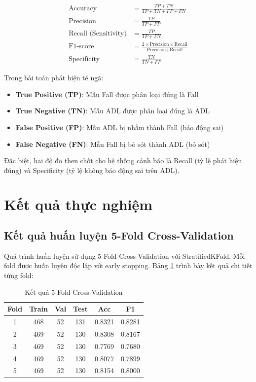 \begin{align}
\text{Accuracy} &= \frac{TP + TN}{TP + TN + FP + FN} \\
\text{Precision} &= \frac{TP}{TP + FP} \\
\text{Recall (Sensitivity)} &= \frac{TP}{TP + FN} \\
\text{F1-score} &= \frac{2 \times \text{Precision} \times \text{Recall}}{\text{Precision} + \text{Recall}} \\
\text{Specificity} &= \frac{TN}{TN + FP}
\end{align}

Trong bài toán phát hiện té ngã:
\begin{itemize}
    \item \textbf{True Positive (TP)}: Mẫu Fall được phân loại đúng là Fall
    \item \textbf{True Negative (TN)}: Mẫu ADL được phân loại đúng là ADL
    \item \textbf{False Positive (FP)}: Mẫu ADL bị nhầm thành Fall (báo động sai)
    \item \textbf{False Negative (FN)}: Mẫu Fall bị bỏ sót thành ADL (bỏ sót)
\end{itemize}

Đặc biệt, hai độ đo then chốt cho hệ thống cảnh báo là Recall (tỷ lệ phát hiện đúng) và Specificity (tỷ lệ không báo động sai trên ADL).


\section{Kết quả thực nghiệm}
\label{sec:results}

\subsection{Kết quả huấn luyện 5-Fold Cross-Validation}
\label{sec:training_results}

Quá trình huấn luyện sử dụng 5-Fold Cross-Validation với StratifiedKFold. Mỗi fold được huấn luyện độc lập với early stopping. Bảng \ref{tab:kfold_results} trình bày kết quả chi tiết từng fold:

\begin{table}[h]
\centering
\caption{Kết quả 5-Fold Cross-Validation}
\label{tab:kfold_results}
\begin{tabular}{|c|c|c|c|c|c|}
\hline
\textbf{Fold} & \textbf{Train} & \textbf{Val} & \textbf{Test} & \textbf{Acc} & \textbf{F1} \\
\hline
1 & 468 & 52 & 131 & 0.8321 & 0.8281 \\
\hline
2 & 469 & 52 & 130 & 0.8308 & 0.8167 \\
\hline
3 & 469 & 52 & 130 & 0.7769 & 0.7680 \\
\hline
4 & 469 & 52 & 130 & 0.8077 & 0.7899 \\
\hline
5 & 469 & 52 & 130 & 0.8154 & 0.8000 \\
\hline
\end{tabular}
\end{table}


